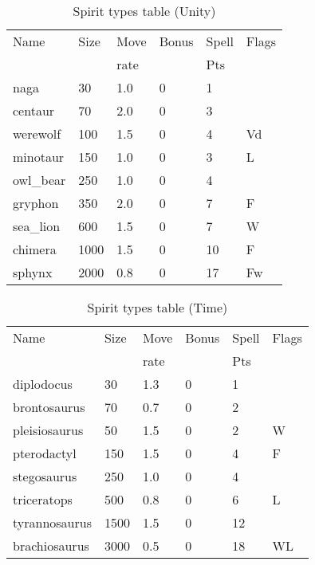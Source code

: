 \begin{same}
\begin{table}[hbpt]
\caption{Spirit types table (Unity)}
\begin{center}
\begin{tabular}{ || l | l | l | l | l | l || }
\hline
Name            & Size & Move & Bonus &Spell&Flags\\
                &      & rate &       &Pts  &\\
\hline
naga            &   30 & 1.0 &   0 &  1 &\\
centaur         &   70 & 2.0 &   0 &  3 &\\
werewolf        &  100 & 1.5 &   0 &  4 &Vd\\
minotaur        &  150 & 1.0 &   0 &  3 &L\\
owl_bear        &  250 & 1.0 &   0 &  4 &\\
gryphon         &  350 & 2.0 &   0 &  7 &F\\
sea_lion        &  600 & 1.5 &   0 &  7 &W\\
chimera         & 1000 & 1.5 &   0 & 10 &F\\
sphynx          & 2000 & 0.8 &   0 & 17 &Fw\\
\hline
\end{tabular}
\end{center}
\end{table}
\end{same}
\begin{same}
\begin{table}[hbpt]
\caption{Spirit types table (Time)}
\begin{center}
\begin{tabular}{ || l | l | l | l | l | l || }
\hline
Name            & Size & Move & Bonus &Spell&Flags\\
                &      & rate &       &Pts  &\\
\hline
diplodocus      &   30 & 1.3 &   0 &  1 &\\
brontosaurus    &   70 & 0.7 &   0 &  2 &\\
pleisiosaurus   &   50 & 1.5 &   0 &  2 &W\\
pterodactyl     &  150 & 1.5 &   0 &  4 &F\\
stegosaurus     &  250 & 1.0 &   0 &  4 &\\
triceratops     &  500 & 0.8 &   0 &  6 &L\\
tyrannosaurus   & 1500 & 1.5 &   0 & 12 &\\
brachiosaurus   & 3000 & 0.5 &   0 & 18 &WL\\
\hline
\end{tabular}
\end{center}
\end{table}
\end{same}
